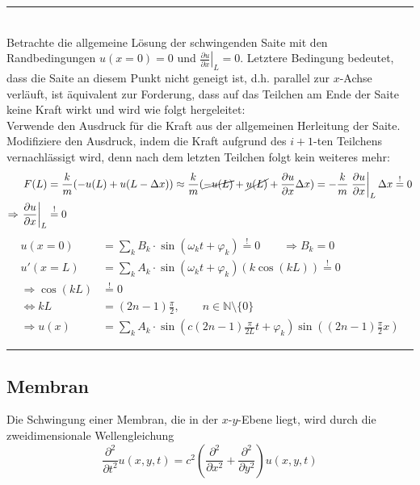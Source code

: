 \documentclass{article}
\newcommand{\lr}[1]{\left(#1\right)}
\begin{document}
\vspace{0.5cm}

{\color{violet}
\hrule
	\\
	Betrachte die allgemeine Lösung der schwingenden Saite mit den Randbedingungen $u(x=0) = 0$ und $\left. \frac{\partial u}{\partial x} \right|_L= 0$. Letztere Bedingung bedeutet, dass die Saite an diesem Punkt nicht geneigt ist, d.h. parallel zur $x$-Achse verläuft, ist äquivalent zur Forderung, dass auf das Teilchen am Ende der Saite keine Kraft wirkt und wird wie folgt hergeleitet:\\
	Verwende den Ausdruck für die Kraft aus der allgemeinen Herleitung der Saite. Modifiziere den Ausdruck, indem die Kraft aufgrund des $i+1$-ten Teilchens vernachlässigt wird, denn nach dem letzten Teilchen folgt kein weiteres mehr:
		\begin{align*}
			F(L) &= \frac{k}{m}(-u(L) + u(L-\Delta x)) \approx \frac{k}{m}(\cancel{ -u(L) } + \cancel{ u(L) } + \frac{\partial u}{\partial x} \Delta x) = -\frac{k}{m} \left. \frac{\partial u}{\partial x} \right|_L \Delta x \stackrel{!}{=} 0 \\
			\Rightarrow \left. \frac{\partial u}{\partial x} \right|_L  &\stackrel{!}{=} 0
		\end{align*}
		\begin{align*}
			u(x=0) &= \sum_k B_k \cdot \sin(\omega_k t + \varphi_k) \stackrel{!}{=} 0 \qquad \Rightarrow B_k = 0 \\
			u'(x=L) &= \sum_k A_k \cdot \sin(\omega_k t + \varphi_k) \lr{ k \cos(kL) } \stackrel{!}{=} 0 \\
			\Rightarrow \cos(kL) &\stackrel{!}{=} 0 \\
			\Leftrightarrow kL &= (2n-1)\frac{\pi}{2}, \qquad n\in\mathbb{N}\setminus\{0\} \\
			\Rightarrow u(x) &= \sum_k A_k \cdot \sin\lr{ c (2n-1)\frac{\pi}{2L}t + \varphi_k } \sin( (2n-1)\frac{\pi}{2} x)
		\end{align*}


\hrule
}


\newpage


\subsection{Membran}
Die Schwingung einer Membran, die in der $x$-$y$-Ebene liegt, wird durch die zweidimensionale Wellengleichung
	\begin{equation}
		\frac{\partial^2}{\partial t^2} u(x,y,t) = c^2 \lr{ \frac{\partial^2}{\partial x^2} + \frac{\partial^2}{\partial y^2} } u(x,y,t)
	\end{equation}
\end{document}
